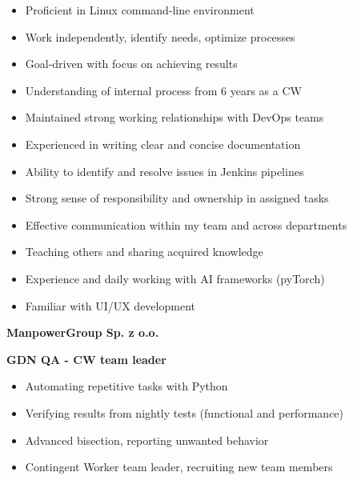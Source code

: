 \documentclass[10pt,a4paper,ragged2e,withhyper]{altacv/altacv}
\begin{document}
\begin{paracol}{2}


\begin{itemize}
\item Proficient in Linux command-line environment
\item Work independently, identify needs, optimize processes
\item Goal-driven with focus on achieving results
\item Understanding of internal process from 6 years as a CW
\item Maintained strong working relationships with DevOps teams
\item Experienced in writing clear and concise documentation
\item Ability to identify and resolve issues in Jenkins pipelines
\item Strong sense of responsibility and ownership in assigned tasks
\item Effective communication within my team and across departments
\item Teaching others and sharing acquired knowledge
\item Experience and daily working with AI frameworks (pyTorch)
\item Familiar with UI/UX development
\end{itemize}


\large\textbf{ManpowerGroup Sp. z o.o.} \normalsize

\medskip

\textbf{\textcolor{accent}{GDN QA - CW team leader}} \hfill {}

\smallskip

\begin{itemize}
\item Automating repetitive tasks with Python
\item Verifying results from nightly tests (functional and performance)
\item Advanced bisection, reporting unwanted behavior
\item Contingent Worker team leader, recruiting new team members
\end{itemize}

\medskip


\end{paracol}
\end{document}
